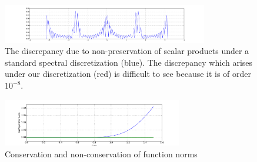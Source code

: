 \documentclass[final,leqno]{siamltex1213}
\begin{document}
\begin{figure}[h]
	\centering
	\includegraphics[width=0.8\textwidth]{./images/function_plots/discrepancy}
	\caption{The discrepancy due to non-preservation of scalar products under a standard spectral discretization (blue).
	The discrepancy which arises under our discretization (red) is difficult to see because it is of order $10^{-8}$. }
	\label{fig:discrepancy}
\end{figure}  
\begin{figure}[h]
	\centering
	\includegraphics[width=0.7\textwidth]{./images/L_inf_plot.pdf}
	\caption{Conservation and non-conservation of function norms}
	\label{fig:norms}
\end{figure}
\end{document}
